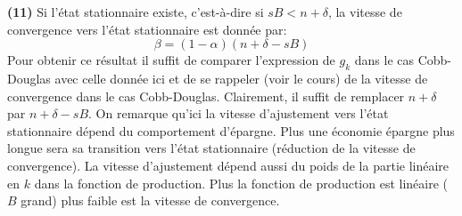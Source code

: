 \documentclass[10pt,a4paper,notitlepage]{article}
\newcommand{\question}[1]{\textbf{(#1)}}
\begin{document}
\question{11} Si l'état stationnaire existe, c'est-à-dire si
$sB<n+\delta$, la vitesse de convergence vers l'état stationnaire est
donnée par:
\[
\beta = (1-\alpha)(n+\delta-sB)
\]
Pour obtenir ce résultat il suffit de comparer l'expression de $g_k$
dans le cas Cobb-Douglas avec celle donnée ici et de se rappeler (voir
le cours) de la vitesse de convergence dans le cas
Cobb-Douglas. Clairement, il suffit de remplacer $n+\delta$ par
$n+\delta-sB$. On remarque qu'ici la vitesse d'ajustement vers l'état
stationnaire dépend du comportement d'épargne. Plus une économie
épargne plus longue sera sa transition vers l'état stationnaire
(réduction de la vitesse de convergence). La vitesse d'ajustement
dépend aussi du poids de la partie linéaire en $k$ dans la fonction de
production. Plus la fonction de production est linéaire ($B$ grand)
plus faible est la vitesse de convergence.
\end{document}
